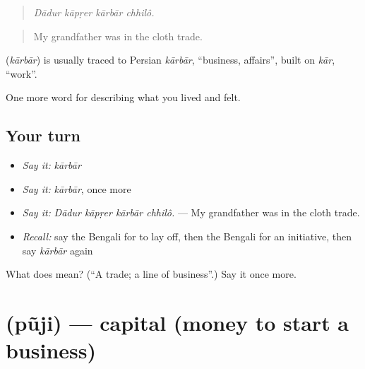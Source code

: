 \begin{quote}
   
\end{quote}

\begin{quote}
\emph{Dādur kāpṛer kārbār chhilô.}
\end{quote}

\begin{quote}
My grandfather was in the cloth trade.
\end{quote}

\begin{cousinweb}
\textbf{} (\emph{kārbār}) is usually traced to Persian \emph{kārbār}, \textquotedblleft{}business, affairs\textquotedblright{}, built on \emph{kār}, \textquotedblleft{}work\textquotedblright{}.
\end{cousinweb}

\begin{grammarlens}[title={What you've built}]
One more word for describing what you lived and felt.
\end{grammarlens}

\subsection*{Your turn}
\begin{itemize}
\raggedright
  \item \emph{Say it:} \emph{kārbār}
  \item \emph{Say it:} \emph{kārbār}, once more
  \item \emph{Say it:} \emph{Dādur kāpṛer kārbār chhilô.} — My grandfather was in the cloth trade.
  \item \emph{Recall:} say the Bengali for to lay off, then the Bengali for an initiative, then say \emph{kārbār} again
\end{itemize}

\begin{tcolorbox}[breakable,colback=teal!4,colframe=teal!35!black,title={Before you move on}]
What does  mean? (\textquotedblleft{}A trade; a line of business\textquotedblright{}.) Say it once more.
\end{tcolorbox}
\section[\texorpdfstring{\bn{পুঁজি} (pũji)}{পুঁজি (pũji)}]{ (pũji) — capital (money to start a business)}

\label{lesson:BN-C498-puji}



